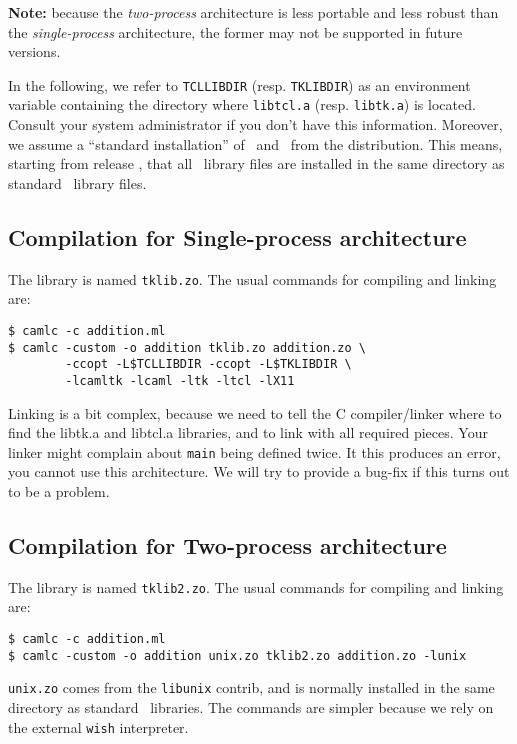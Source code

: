 {\bf Note: } because the {\em two-process} architecture is less portable and
less robust than the {\em single-process} architecture, the former may not
be supported in future versions.


In the following, we refer to \verb|TCLLIBDIR| (resp. \verb|TKLIBDIR|) as
an environment variable containing the directory where \verb|libtcl.a|
(resp. \verb|libtk.a|) is located. Consult your system administrator if you
don't have this information. Moreover, we assume a ``standard installation''
of \caml\ and \camltk\ from the distribution. This means, starting from
release \thisrelease, that all \camltk\ library files are installed in the
same directory as standard \caml\ library files.

\subsection{Compilation for Single-process architecture}
The library is named \verb|tklib.zo|.
The usual commands for compiling and linking are:
\begin{verbatim}
$ camlc -c addition.ml
$ camlc -custom -o addition tklib.zo addition.zo \
        -ccopt -L$TCLLIBDIR -ccopt -L$TKLIBDIR \
        -lcamltk -lcaml -ltk -ltcl -lX11
\end{verbatim}
Linking is a bit complex, because we need to tell the C compiler/linker
where to find the libtk.a and libtcl.a libraries, and to link with all
required pieces. Your linker might complain about \verb|main| being defined
twice. It this produces an error, you cannot use this architecture.
We will try to provide a bug-fix if this turns out to be a problem.

\subsection{Compilation for Two-process architecture}
The library is named \verb|tklib2.zo|.
The usual commands for compiling and linking are:
\begin{verbatim}
$ camlc -c addition.ml
$ camlc -custom -o addition unix.zo tklib2.zo addition.zo -lunix
\end{verbatim} 
 \verb|unix.zo| comes from the \verb|libunix| contrib, and is normally
installed in the same directory as standard \caml\ libraries. 
The commands are simpler because we rely on the external \verb|wish|
interpreter.

